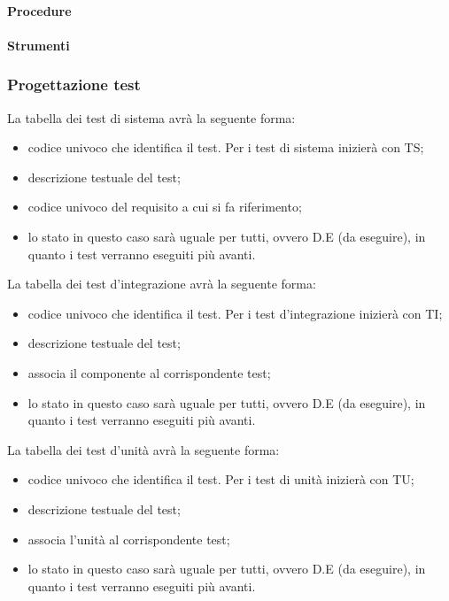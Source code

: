 \paragraph{Procedure}

\paragraph{Strumenti}

\subsubsection{Progettazione test}
\label{prog_test}

La tabella dei test di sistema avrà la seguente forma:
\begin{itemize}
\item {}codice univoco che identifica il test. Per i test di sistema inizierà con TS;
\item {} descrizione testuale del test;
\item {}codice univoco del requisito a cui si fa riferimento;
\item {}lo stato in questo caso sarà uguale per tutti, ovvero D.E (da eseguire), in quanto i test verranno eseguiti più avanti.
\end{itemize}
La tabella dei test d'integrazione avrà la seguente forma:
\begin{itemize}
\item {}codice univoco che identifica il test. Per i test d'integrazione inizierà con TI;
\item {} descrizione testuale del test;
\item {} associa il componente al corrispondente test;
\item {}lo stato in questo caso sarà uguale per tutti, ovvero D.E (da eseguire), in quanto i test verranno eseguiti più avanti.
\end{itemize}

La tabella dei test d'unità avrà la seguente forma:
\begin{itemize}
\item {}codice univoco che identifica il test. Per i test di unità inizierà con TU;
\item {} descrizione testuale del test;
\item {} associa l'unità al corrispondente test;
\item {}lo stato in questo caso sarà uguale per tutti, ovvero D.E (da eseguire), in quanto i test verranno eseguiti più avanti.
\end{itemize}

